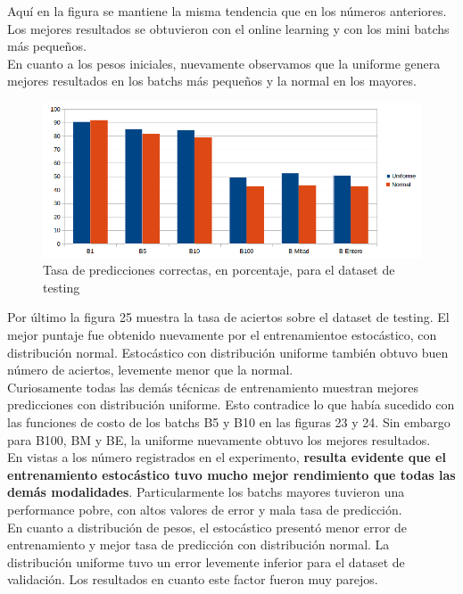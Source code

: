 Aquí en la figura se mantiene la misma tendencia que en los números anteriores. Los mejores resultados se obtuvieron con el online learning y con los mini batchs más pequeños.\\

En cuanto a los pesos iniciales, nuevamente observamos que la uniforme genera mejores resultados en los batchs más pequeños y la normal en los mayores.

\begin{figure}[h]
  \begin{center}
  \includegraphics[scale=0.65]{graficos/distribucion_eficiencia.png}
  \caption{Tasa de predicciones correctas, en porcentaje, para el dataset de testing}
  \end{center}
\end{figure}

Por último la figura 25 muestra la tasa de aciertos sobre el dataset de testing. El mejor puntaje fue obtenido nuevamente por el entrenamientoe estocástico, con distribución normal. Estocástico con distribución uniforme también obtuvo buen número de aciertos, levemente menor que la normal.\\

Curiosamente todas las demás técnicas de entrenamiento muestran mejores predicciones con distribución uniforme. Esto contradice lo que había sucedido con las funciones de costo de los batchs B5 y B10 en las figuras 23 y 24. Sin embargo para B100, BM y BE, la uniforme nuevamente obtuvo los mejores resultados.\\

En vistas a los número registrados en el experimento, \textbf{resulta evidente que el entrenamiento estocástico tuvo mucho mejor rendimiento que todas las demás modalidades}. Particularmente los batchs mayores tuvieron una performance pobre, con altos valores de error y mala tasa de predicción.\\

En cuanto a distribución de pesos, el estocástico presentó menor error de entrenamiento y mejor tasa de predicción con distribución normal. La distribución uniforme tuvo un error levemente inferior para el dataset de validación. Los resultados en cuanto este factor fueron muy parejos.


